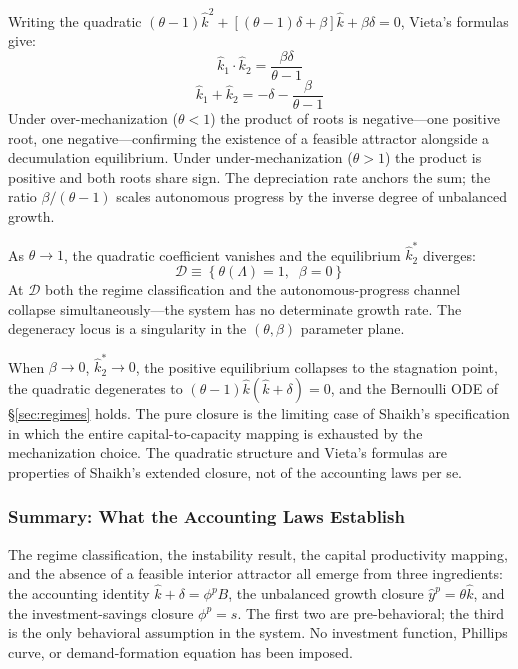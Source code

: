 \documentclass[11pt,a4paper]{article}
\begin{document}
Writing the quadratic $(\theta - 1)\hat{k}^2 + [(\theta - 1)\delta + \beta]\hat{k} + \beta\delta = 0$, Vieta's formulas give:
%
\begin{equation}\label{eq:vieta_product}
	\hat{k}_1 \cdot \hat{k}_2 = \frac{\beta\delta}{\theta - 1}
\end{equation}
%
\begin{equation}\label{eq:vieta_sum}
	\hat{k}_1 + \hat{k}_2 = -\delta - \frac{\beta}{\theta - 1}
\end{equation}
%
Under over-mechanization ($\theta < 1$) the product of roots is negative---one positive root, one negative---confirming the existence of a feasible attractor alongside a decumulation equilibrium. Under under-mechanization ($\theta > 1$) the product is positive and both roots share sign. The depreciation rate anchors the sum; the ratio $\beta/(\theta - 1)$ scales autonomous progress by the inverse degree of unbalanced growth.

As $\theta \to 1$, the quadratic coefficient vanishes and the equilibrium $\hat{k}_2^*$ diverges:
%
\begin{equation}\label{eq:degeneracy}
	\mathcal{D} \equiv \left\{\theta(\Lambda) = 1,\;\; \beta = 0\right\}
\end{equation}
%
At $\mathcal{D}$ both the regime classification and the autonomous-progress channel collapse simultaneously---the system has no determinate growth rate. The degeneracy locus is a singularity in the $(\theta, \beta)$ parameter plane.

When $\beta \to 0$, $\hat{k}_2^* \to 0$, the positive equilibrium collapses to the stagnation point, the quadratic degenerates to $(\theta - 1)\hat{k}(\hat{k} + \delta) = 0$, and the Bernoulli ODE of \S\ref{sec:regimes} holds. The pure closure is the limiting case of Shaikh's specification in which the entire capital-to-capacity mapping is exhausted by the mechanization choice. The quadratic structure and Vieta's formulas are properties of Shaikh's extended closure, not of the accounting laws per se.



\subsubsection{Summary: What the Accounting Laws Establish}
\label{sec:accounting_summary}

The regime classification, the instability result, the capital productivity mapping, and the absence of a feasible interior attractor all emerge from three ingredients: the accounting identity $\hat{k} + \delta = \phi^p B$, the unbalanced growth closure $\hat{y}^p = \theta\hat{k}$, and the investment-savings closure $\phi^p = s$. The first two are pre-behavioral; the third is the only behavioral assumption in the system. No investment function, Phillips curve, or demand-formation equation has been imposed.
\end{document}
